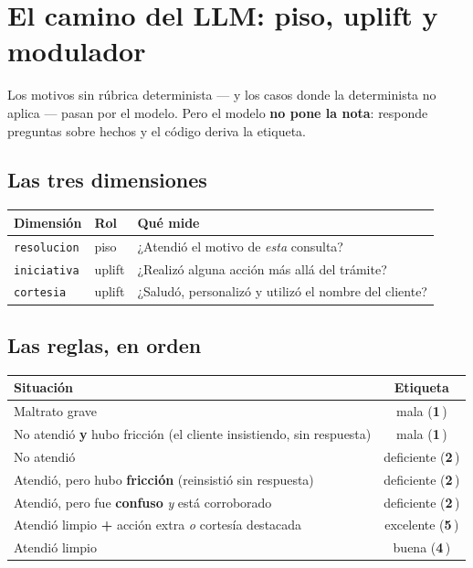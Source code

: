 \documentclass[11pt,a4paper]{article}
\newcommand{\cod}[1]{\texttt{\small #1}}
\newcommand{\est}[1]{\textbf{#1}\,\raisebox{0.5pt}{$\star$}}
\begin{document}
\newpage
\section{El camino del LLM: piso, uplift y modulador}

Los motivos sin rúbrica determinista --- y los casos donde la determinista no
aplica --- pasan por el modelo. Pero el modelo \textbf{no pone la nota}: responde
preguntas sobre hechos y el código deriva la etiqueta.

\subsection{Las tres dimensiones}

\begin{center}
\begin{tabularx}{\textwidth}{@{}llX@{}}
\toprule
\textbf{Dimensión} & \textbf{Rol} & \textbf{Qué mide} \\
\midrule
\cod{resolucion} & piso   & ¿Atendió el motivo de \emph{esta} consulta? \\
\cod{iniciativa} & uplift & ¿Realizó alguna acción más allá del trámite? \\
\cod{cortesia}   & uplift & ¿Saludó, personalizó y utilizó el nombre del cliente? \\
\bottomrule
\end{tabularx}
\end{center}

\subsection{Las reglas, en orden}

\begin{center}
\begin{tabularx}{\textwidth}{@{}Xc@{}}
\toprule
\textbf{Situación} & \textbf{Etiqueta} \\
\midrule
Maltrato grave & mala (\est{1}) \\
No atendió \textbf{y} hubo fricción (el cliente insistiendo, sin respuesta) & mala (\est{1}) \\
No atendió & deficiente (\est{2}) \\
Atendió, pero hubo \textbf{fricción} (reinsistió sin respuesta) & deficiente (\est{2}) \\
Atendió, pero fue \textbf{confuso} \emph{y} está corroborado & deficiente (\est{2}) \\
Atendió limpio \textbf{+} acción extra \emph{o} cortesía destacada & excelente (\est{5}) \\
Atendió limpio & buena (\est{4}) \\
\bottomrule
\end{tabularx}
\end{center}
\end{document}
